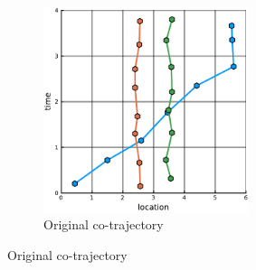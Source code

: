 \documentclass[12pt]{article}
\theoremstyle{definition}
\begin{document}
\begin{figure}
    \centering
    \begin{subfigure}[t]{0.45\textwidth}
      \includegraphics[width=6cm]{swaporder_counterexample-a.pdf}
      \caption{Original co-trajectory}
      \label{fig:swap-order-counter-example-a}
    \end{subfigure}


\end{figure}
\end{document}
